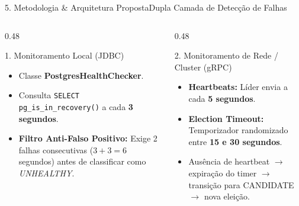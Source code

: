\documentclass[aspectratio=169,10pt]{beamer}
\begin{document}
\begin{frame}{5. Metodologia \& Arquitetura Proposta}{Dupla Camada de Detecção de Falhas}
  \begin{columns}[t]
    \begin{column}{0.48\textwidth}
      \begin{block}{1. Monitoramento Local (JDBC)}
        \begin{itemize}
          \item Classe \textbf{PostgresHealthChecker}.
          \item Consulta \texttt{SELECT pg\_is\_in\_recovery()} a cada \textbf{3 segundos}.
          \item \textbf{Filtro Anti-Falso Positivo:} Exige 2 falhas consecutivas ($3 + 3 = 6$ segundos) antes de classificar como \textit{UNHEALTHY}.
        \end{itemize}
      \end{block}
    \end{column}
    \begin{column}{0.48\textwidth}
      \begin{block}{2. Monitoramento de Rede / Cluster (gRPC)}
        \begin{itemize}
          \item \textbf{Heartbeats:} Líder envia a cada \textbf{5 segundos}.
          \item \textbf{Election Timeout:} Temporizador randomizado entre \textbf{15 e 30 segundos}.
          \item Ausência de heartbeat $\rightarrow$ expiração do timer $\rightarrow$ transição para CANDIDATE $\rightarrow$ nova eleição.
        \end{itemize}
      \end{block}
    \end{column}
  \end{columns}
\end{frame}
\end{document}
